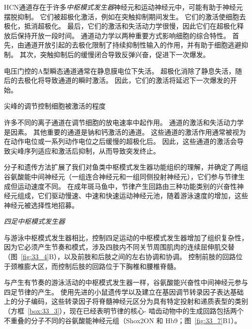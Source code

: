 \begin{proposition}[神经元离子通道有助于中枢模式发生器功能]
	\quad \quad HCN通道存在于许多\textit{中枢模式发生器}神经元和运动神经元中，可能有助于神经元摆脱抑制。
	它们被超极化激活，例如在突触抑制期间发生。
	它们的激活使细胞去极化，抵消超极化。
	最后，它们的激活和失活动力学很慢，因此它们在超极化释放后保持开放一段时间。
	通道动力学以两种重要方式影响细胞的综合特性。
	首先，由通道开放引起的去极化限制了持续抑制性输入的作用，并有助于细胞逃避抑制。
	其次，突触抑制后的缓慢闭合导致反弹兴奋，促进下一次爆发。
	
	\quad \quad 电压门控的A型瞬态通道通常在静息膜电位下失活。
	超极化消除了静息失活，随后的去极化将导致通道的瞬时激活。
	因此，它们的激活将延迟下一次爆发的开始。
	
	\quad \quad 尖峰的调节控制细胞被激活的程度
	
	\quad \quad 许多不同的离子通道在调节细胞的放电速率中起作用。
	通道的激活和失活动力学是因素。
	其他重要的通道是钠和钙激活的通道。
	这些通道的激活作用通常被视为在动作电位或一系列动作电位之后缓慢的超极化后。
	因此，这些通道的激活会导致尖峰序列适应和激活后抑制，从而导致突发终止。
	
\end{proposition}


分子和遗传方法扩展了我们对鱼类中枢模式发生器功能组织的理解，并确定了两组谷氨酸能中间神经元（一组连合神经元和一组同侧投射神经元），它们参与节律生成但运动速度不同。
在成年斑马鱼中，节律产生回路由三种功能类别的兴奋性神经元组成，它们驱动慢速、中速和快速运动神经元池，随着游泳速度的增加，这些神经元被选择性地招募。


\textit{四足中枢模式发生器}

与游泳中枢模式发生器相比，控制四足运动的中枢模式发生器增加了组织复杂性，因为它必须产生节奏和模式，涉及四肢内不同关节周围肌肉的连续屈伸肌交替（图~\ref{fig:33_4}B），以及前肢和后肢之间的左右协调和协调。
控制前肢的回路位于颈椎膨大区，而控制后肢的回路位于下胸椎和腰椎脊髓。


与产生有节奏的游泳活动的中枢模式发生器一样，谷氨酸能兴奋性中间神经元参与四足节律的产生。
使用先进的小鼠遗传学以及建立在基因调节转录因子表达基础上的分子编码，这些转录因子将脊髓神经元区分为具有特定投射和递质表型的类别（方框~\ref{box:33_3}），现在已经表明节律的核心- 啮齿动物中的生成回路包括两个不重叠的分子不同的谷氨酸能神经元组（Shox2ON 和 Hb9；图~\ref{fig:33_7}B1）。



